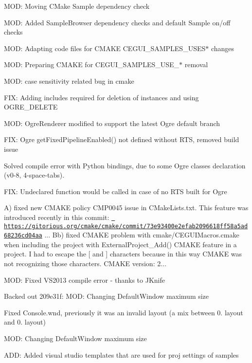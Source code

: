 \begin{DoxyItemize}
\item M\+OD\+: Moving C\+Make Sample dependency check
\item M\+OD\+: Added Sample\+Browser dependency checks and default Sample on/off checks
\item M\+OD\+: Adapting code files for C\+M\+A\+KE C\+E\+G\+U\+I\+\_\+\+S\+A\+M\+P\+L\+E\+S\+\_\+\+U\+S\+E\+S$\ast$ changes
\item M\+OD\+: Preparing C\+M\+A\+KE for C\+E\+G\+U\+I\+\_\+\+S\+A\+M\+P\+L\+E\+S\+\_\+\+U\+S\+E\+\_\+$\ast$ removal
\item M\+OD\+: case sensitivity related bug in cmake
\item F\+IX\+: Adding includes required for deletion of instances and using O\+G\+R\+E\+\_\+\+D\+E\+L\+E\+TE
\item M\+OD\+: Ogre\+Renderer modified to support the latest Ogre default branch
\item F\+IX\+: Ogre get\+Fixed\+Pipeline\+Enabled() not defined without R\+TS, removed build issue
\item Solved compile error with Python bindings, due to some Ogre classes declaration (v0-\/8, 4-\/space-\/tabs).
\item F\+IX\+: Undeclared function would be called in case of no R\+TS built for Ogre
\item A) fixed new C\+M\+A\+KE policy C\+M\+P0045 issue in C\+Make\+Lists.\+txt. This feature was introduced recently in this commit\+: \href{https://gitorious.org/cmake/cmake/commit/73e93400e2efab2096618ff58a5ad68236cd04aa}{\texttt{ https\+://gitorious.\+org/cmake/cmake/commit/73e93400e2efab2096618ff58a5ad68236cd04aa}} ... Bb) fixed C\+M\+A\+KE problem with cmake/\+C\+E\+G\+U\+I\+Macros.\+cmake when including the project with External\+Project\+\_\+\+Add() C\+M\+A\+KE feature in a project. I had to escape the \textquotesingle{}\mbox{[}\textquotesingle{} and \textquotesingle{}\mbox{]}\textquotesingle{} characters because in this way C\+M\+A\+KE was not recognizing those characters. C\+M\+A\+KE version\+: 2...
\item M\+OD\+: Fixed V\+S2013 compile error -\/ thanks to J\+Knife
\item Backed out 209e31f\+: M\+OD\+: Changing Default\+Window maximum size
\item Fixed Console.\+wnd, previously it was an invalid layout (a mix between 0. layout and 0. layout)
\item M\+OD\+: Changing Default\+Window maximum size
\item A\+DD\+: Added visual studio templates that are used for proj settings of samples

\end{DoxyItemize}
